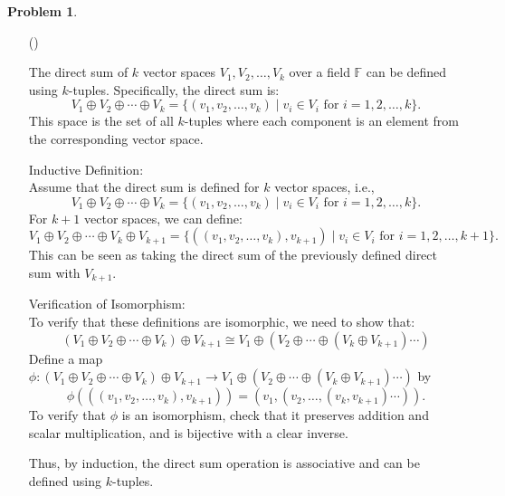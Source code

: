 \documentclass[12pt]{article}
\theoremstyle{definition}
\newtheorem{problem}{Problem}
\newcounter{subq}[problem]
\newenvironment{subproblem}
{\refstepcounter{subq} \begin{itemize} \item[(\alph{subq})]}
{\end{itemize} \medskip}
\begin{document}
\begin{problem}
\begin{subproblem}
        \begin{solution}
            The direct sum of \( k \) vector spaces \( V_1, V_2, \ldots, V_k \) over a field \( \mathbb{F} \) can be defined using \( k \)-tuples. Specifically, the direct sum is:
            \[
            V_1 \oplus V_2 \oplus \cdots \oplus V_k = \{ (v_1, v_2, \ldots, v_k) \mid v_i \in V_i \text{ for } i = 1, 2, \ldots, k \}.
            \]
            This space is the set of all \( k \)-tuples where each component is an element from the corresponding vector space.

            Inductive Definition:\\
            Assume that the direct sum is defined for \( k \) vector spaces, i.e.,
            \[
            V_1 \oplus V_2 \oplus \cdots \oplus V_k = \{ (v_1, v_2, \ldots, v_k) \mid v_i \in V_i \text{ for } i = 1, 2, \ldots, k \}.
            \]
            For \( k + 1 \) vector spaces, we can define:
            \[
            V_1 \oplus V_2 \oplus \cdots \oplus V_k \oplus V_{k+1} = \{ ((v_1, v_2, \ldots, v_k), v_{k+1}) \mid v_i \in V_i \text{ for } i = 1, 2, \ldots, k+1 \}.
            \]
            This can be seen as taking the direct sum of the previously defined direct sum with \( V_{k+1} \).

            Verification of Isomorphism:\\
            To verify that these definitions are isomorphic, we need to show that:
            \[
            (V_1 \oplus V_2 \oplus \cdots \oplus V_k) \oplus V_{k+1} \cong V_1 \oplus (V_2 \oplus \cdots \oplus (V_k \oplus V_{k+1}) \cdots)
            \]
            Define a map \( \phi: (V_1 \oplus V_2 \oplus \cdots \oplus V_k) \oplus V_{k+1} \to V_1 \oplus (V_2 \oplus \cdots \oplus (V_k \oplus V_{k+1}) \cdots) \) by
            \[        \phi(((v_1, v_2, \ldots, v_k), v_{k+1})) = (v_1, (v_2, \ldots, (v_k, v_{k+1}) \cdots)).        \]
            To verify that \( \phi \) is an isomorphism, check that it preserves addition and scalar multiplication, and is bijective with a clear inverse.

            Thus, by induction, the direct sum operation is associative and can be defined using \( k \)-tuples.
        

        \end{solution}
    \end{subproblem}
\end{problem}
\end{document}
